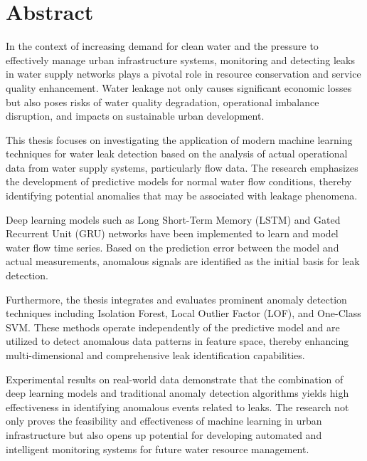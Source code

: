 \chapter*{Abstract}

In the context of increasing demand for clean water and the pressure to effectively manage urban infrastructure systems, monitoring and detecting leaks in water supply networks plays a pivotal role in resource conservation and service quality enhancement. Water leakage not only causes significant economic losses but also poses risks of water quality degradation, operational imbalance disruption, and impacts on sustainable urban development.

This thesis focuses on investigating the application of modern machine learning techniques for water leak detection based on the analysis of actual operational data from water supply systems, particularly flow data. The research emphasizes the development of predictive models for normal water flow conditions, thereby identifying potential anomalies that may be associated with leakage phenomena.

Deep learning models such as Long Short-Term Memory (LSTM) and Gated Recurrent Unit (GRU) networks have been implemented to learn and model water flow time series. Based on the prediction error between the model and actual measurements, anomalous signals are identified as the initial basis for leak detection.

Furthermore, the thesis integrates and evaluates prominent anomaly detection techniques including Isolation Forest, Local Outlier Factor (LOF), and One-Class SVM. These methods operate independently of the predictive model and are utilized to detect anomalous data patterns in feature space, thereby enhancing multi-dimensional and comprehensive leak identification capabilities.

Experimental results on real-world data demonstrate that the combination of deep learning models and traditional anomaly detection algorithms yields high effectiveness in identifying anomalous events related to leaks. The research not only proves the feasibility and effectiveness of machine learning in urban infrastructure but also opens up potential for developing automated and intelligent monitoring systems for future water resource management.